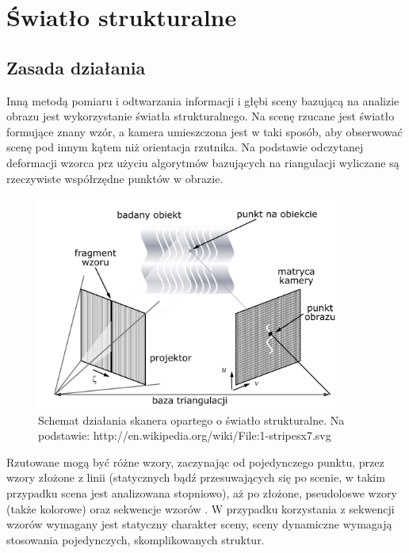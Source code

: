 \section{Światło strukturalne}

\subsection{Zasada działania}

Inną metodą pomiaru i odtwarzania informacji i głębi sceny bazującą na analizie
obrazu jest wykorzystanie światła strukturalnego. Na scenę rzucane jest światło
formujące znany wzór, a kamera umieszczona jest w taki sposób, aby obserwować
scenę pod innym kątem niż orientacja rzutnika. Na podstawie odczytanej deformacji
wzorca prz użyciu algorytmów bazujących na riangulacji wyliczane są rzeczywiste
współrzędne punktów w obrazie. 

\begin{figure}[htb!]
\centering
\includegraphics[width=10cm]{../../Common/img/struct} 
\caption[Schemat działania skanera opartego o światło strukturalne]
{Schemat działania skanera opartego o światło strukturalne. Na podstawie:
http://en.wikipedia.org/wiki/File:1-stripesx7.svg}
\label{fig:struct_principle}
\end{figure}

Rzutowane mogą być różne wzory, zaczynając od pojedynczego punktu, przez
wzory złożone z linii (statycznych bądź przesuwających się po
scenie, w takim przypadku scena jest analizowana stopniowo), aż po złożone,
pseudoloswe wzory (także kolorowe) oraz sekwencje wzorów \cite{1588327}. W
przypadku korzystania z sekwencji wzorów wymagany jest statyczny charakter
sceny, sceny dynamiczne wymagają stosowania pojedynczych, skomplikowanych
struktur.

